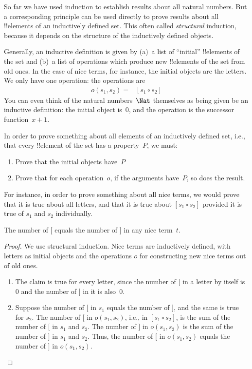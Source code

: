 \documentclass[../../../include/open-logic-section]{subfiles}
\begin{document}


So far we have used induction to establish results about all natural
numbers. But a corresponding principle can be used directly to prove
results about all !!{element}s of an inductively defined set.  This
often called \emph{structural} induction, because it depends on the
structure of the inductively defined objects.

Generally, an inductive definition is given by (a)~a list of
``initial'' !!{element}s of the set and (b)~a list of operations which
produce new !!{element}s of the set from old ones. In the case of nice
terms, for instance, the initial objects are the letters. We only have
one operation: the operations are
\begin{align*}
  o(s_1, s_2) = & [s_1 \circ s_2]
\end{align*}
You can even think of the natural numbers~$\Nat$ themselves as being
given be an inductive definition: the initial object is~$0$, and the
operation is the successor function~$x + 1$.

In order to prove something about all elements of an inductively
defined set, i.e., that every !!{element} of the set has a
property~$P$, we must:
\begin{enumerate}
\item Prove that the initial objects have~$P$
\item Prove that for each operation~$o$, if the arguments have~$P$,
  so does the result.
\end{enumerate}
For instance, in order to prove something about all nice terms, we
would prove that it is true about all letters, and that it is true
about $[s_1 \circ s_2]$ provided it is true of $s_1$ and $s_2$
individually.

\begin{prop}
  The number of $[$ equals the number of $]$ in any nice term~$t$.
\end{prop}

\begin{proof}
We use structural induction.  Nice terms are inductively defined, with
letters as initial objects and the operations $o$ for constructing new
nice terms out of old ones.
\begin{enumerate}
\item The claim is true for every letter, since the number of $[$ in a
  letter by itself is~$0$ and the number of $]$ in it is also~$0$.
\item Suppose the number of $[$ in $s_1$ equals the number of $]$, and
  the same is true for $s_2$. The number of $[$ in $o(s_1, s_2)$, i.e., in
    $[s_1 \circ s_2]$, is the sum of the number of $[$ in $s_1$ and
      $s_2$. The number of $]$ in $o(s_1, s_2)$ is the sum of the number
    of $]$ in $s_1$ and $s_2$. Thus, the number of $[$ in $o(s_1, s_2)$
    equals the number of $]$ in $o(s_1,s_2)$.
\end{enumerate}
\end{proof}
\end{document}
